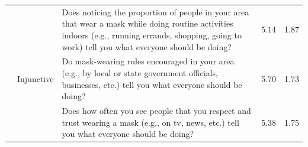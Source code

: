 \documentclass[
  man, donotrepeattitle,floatsintext]{apa6}
\newenvironment{lltable}{\begin{landscape}\centering\begin{ThreePartTable}}{\end{ThreePartTable}\end{landscape}}
\begin{document}
\begin{lltable}
\begin{longtable}{m{2.5cm}m{2cm}m{12.5cm}m{1cm}m{1cm}}
 &  & Does noticing the proportion of people in your area that wear a mask while doing routine activities indoors (e.g., running errands, shopping, going to work) tell you what everyone should be doing? & 5.14 & 1.87\\
 & Injunctive & Do mask-wearing rules encouraged in your area (e.g., by local or state government officials, businesses, etc.) tell you what everyone should be doing? & 5.70 & 1.73\\
 &  & Does how often you see people that you respect and trust wearing a mask (e.g., on tv, news, etc.) tell you what everyone should be doing? & 5.38 & 1.75\\
\bottomrule
\end{longtable}

\end{lltable}

\newpage
\end{document}
